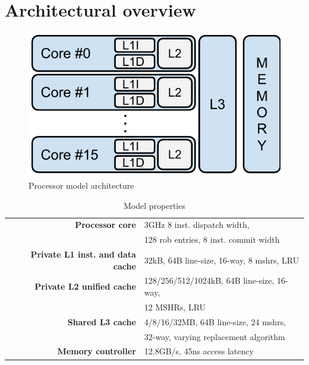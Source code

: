 \section{Architectural overview}

\begin{figure}[ht]
\centering
\includegraphics[scale=.5]{figures/processor_model/processor_model}
\caption{Processor model architecture}
\label{fig:processor_model}
\end{figure}

\begin{table}[ht]
\centering
\begin{tabular}{rl}
\toprule
\bf{Processor core}                 & 3GHz 8 inst. dispatch width,          \\
                                    & 128 rob entries, 8 inst. commit width \\
\bf{Private L1 inst. and data cache}& 32kB, 64B line-size, 16-way, 8 mshrs, LRU \\
\bf{Private L2 unified cache}       & 128/256/512/1024kB, 64B line-size, 16-way, \\
                                    & 12 MSHRs, LRU      \\
\bf{Shared L3 cache}                & 4/8/16/32MB, 64B line-size, 24 mshrs, \\
                                    & 32-way, varying replacement algorithm         \\
\bf{Memory controller}              & 12.8GB/s, 45ns access latency         \\
\bottomrule                             
\end{tabular}
\caption{Model properties}
\label{tbl:processor_model:properties}
\end{table}

